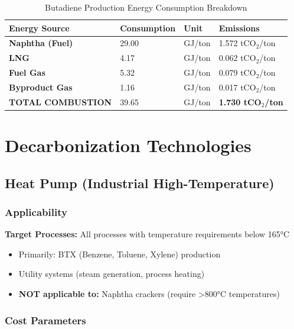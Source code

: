 \documentclass[11pt,a4paper]{report}
\newcommand{\tco}{tCO$_2$}
\begin{document}
\begin{table}[H]
\centering
\caption{Butadiene Production Energy Consumption Breakdown}
\begin{tabular}{p{5cm}p{3cm}p{2cm}p{3cm}}
\toprule
\textbf{Energy Source} & \textbf{Consumption} & \textbf{Unit} & \textbf{Emissions} \\
\midrule
\textbf{Naphtha (Fuel)} & 29.00 & GJ/ton & 1.572 \tco/ton \\
\textbf{LNG} & 4.17 & GJ/ton & 0.062 \tco/ton \\
\textbf{Fuel Gas} & 5.32 & GJ/ton & 0.079 \tco/ton \\
\textbf{Byproduct Gas} & 1.16 & GJ/ton & 0.017 \tco/ton \\
\midrule
\textbf{TOTAL COMBUSTION} & 39.65 & GJ/ton & \textbf{1.730 \tco/ton} \\
\bottomrule
\end{tabular}
\label{tab:butadiene-baseline}
\end{table}

\clearpage

\chapter{Decarbonization Technologies}

\section{Heat Pump (Industrial High-Temperature)}

\subsection{Applicability}

\textbf{Target Processes:} All processes with temperature requirements below 165°C
\begin{itemize}[leftmargin=*]
    \item Primarily: BTX (Benzene, Toluene, Xylene) production
    \item Utility systems (steam generation, process heating)
    \item \textbf{NOT applicable to:} Naphtha crackers (require >800°C temperatures)
\end{itemize}

\subsection{Cost Parameters}
\end{document}
